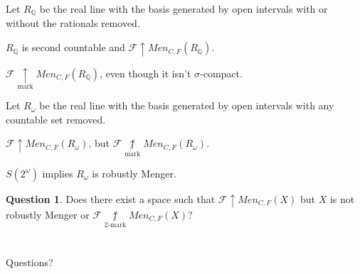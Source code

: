 \documentclass{beamer}
\theoremstyle{example}
\theoremstyle{definition}
\newtheorem{question}[theorem]{Question}
\newcommand{\win}{\uparrow}
\newcommand{\markwin}{\underset{\text{mark}}{\uparrow}}
\newcommand{\notmarkwin}{\underset{\text{mark}}{\not\uparrow}}
\newcommand{\notkmarkwin}[1]{\underset{#1\text{-mark}}{\not\uparrow}}
\newcommand{\menGame}[1]{Men_{C,F}\left({#1}\right)}
\newcommand{\<}{\langle}
\renewcommand{\>}{\rangle}
\newcommand{\mb}[1]{\mathbb{#1}}
\newcommand{\alcompS}[1]{S(#1)}
\newcommand{\pl}[1]{\mathscr{#1}}
\begin{document}
\begin{frame}
  \begin{example}
    Let \(R_{\mb Q}\) be the real line with the basis generated by
    open intervals with or without the rationals removed.
  \end{example}

  \pause

  \begin{theorem}
    \(R_{\mb Q}\) is second countable and
    \(\pl F\win\menGame{R_{\mb Q}}\).
  \end{theorem}

  \begin{corollary}
    \(\pl F\markwin\menGame{R_{\mb Q}}\), even though it isn't
    \(\sigma\)-compact.
  \end{corollary}
\end{frame}

\begin{frame}
  \begin{example}
    Let \(R_{\omega}\) be the real line with the basis generated by
    open intervals with any countable set removed.
  \end{example}

  \pause

  \begin{theorem}
    \(\pl F\win\menGame{R_\omega}\), but
    \(\pl F\notmarkwin\menGame{R_\omega}\).
  \end{theorem}

  \pause

  \begin{theorem}
    \(\alcompS{2^\omega}\) implies \(R_\omega\) is robustly Menger.
  \end{theorem}

  \pause

  \begin{question}
    Does there exist a space such that \(\pl F\win\menGame{X}\)
    but \(X\) is not robustly Menger or \(\pl F\notkmarkwin{2}\menGame{X}\)?
  \end{question}
\end{frame}

\section*{}

\begin{frame}[allowframebreaks]
  \tiny
  
  
\end{frame}

\begin{frame}
  Questions?
\end{frame}
\end{document}
